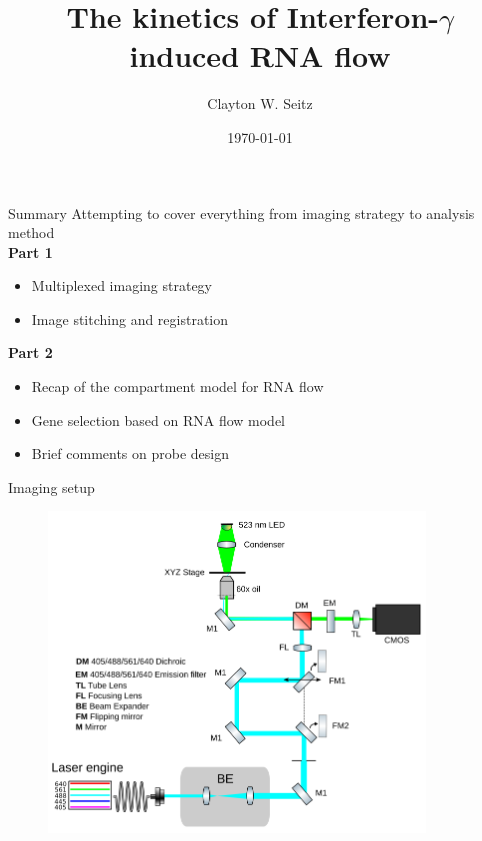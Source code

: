 \documentclass[aspectratio=1610]{beamer}					%
\title{The kinetics of Interferon-$\gamma$ induced RNA flow}	%
\author{Clayton W. Seitz}								%
\date{\today}									%
\begin{document}
\begin{frame}
  \titlepage
\end{frame}


%

\begin{frame}{Summary}
Attempting to cover everything from imaging strategy to analysis method\\
\vspace{0.2in}
\textbf{Part 1}
\begin{itemize}
\item Multiplexed imaging strategy
\item Image stitching and registration
\end{itemize}
\textbf{Part 2}
\begin{itemize}
\item Recap of the compartment model for RNA flow
\item Gene selection based on RNA flow model
\item Brief comments on probe design
\end{itemize}
\end{frame}

\begin{frame}{Imaging setup}
\begin{figure}
\includegraphics[width=10cm]{hilo-epi.png}
\end{figure}
\end{frame}
\end{document}

